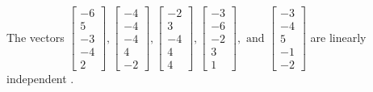 \begin{exercise}
\begin{exerciseStatement}
  \end{exerciseStatement}
  \begin{exerciseAnswer}
   The vectors \(\left[\begin{array}{r}
-6 \\
5 \\
-3 \\
-4 \\
2
\end{array}\right] , \left[\begin{array}{r}
-4 \\
-4 \\
-4 \\
4 \\
-2
\end{array}\right] , \left[\begin{array}{r}
-2 \\
3 \\
-4 \\
4 \\
4
\end{array}\right] , \left[\begin{array}{r}
-3 \\
-6 \\
-2 \\
3 \\
1
\end{array}\right] , \text{ and } \left[\begin{array}{r}
-3 \\
-4 \\
5 \\
-1 \\
-2
\end{array}\right]\) are 
  	 linearly independent  .
  


  \end{exerciseAnswer}
\end{exercise}